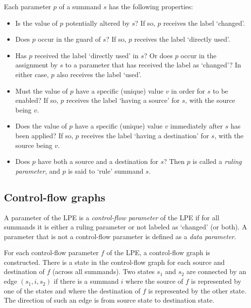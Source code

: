 Each parameter $p$ of a summand $s$ has the following properties:
\begin{itemize}

\item Is the value of $p$ potentially altered by $s$?
If so, $p$ receives the label `changed'.

\item Does $p$ occur in the guard of $s$?
If so, $p$ receives the label `directly used'.

\item Has $p$ received the label `directly used' in $s$?
Or does $p$ occur in the assignment by $s$ to a parameter that has received the label as `changed'?
In either case, $p$ also receives the label `used'.

\item Must the value of $p$ have a specific (unique) value $v$ in order for $s$ to be enabled?
If so, $p$ receives the label `having a source' for $s$, with the source being $v$.

\item Does the value of $p$ have a specific (unique) value $v$ immediately after $s$ has been applied?
If so, $p$ receives the label `having a destination' for $s$, with the source being $v$.

\item Does $p$ have both a source and a destination for $s$?
Then $p$ is called a \emph{ruling parameter}, and $p$ is said to `rule' summand $s$.

\end{itemize}

\subsection{Control-flow graphs}

A parameter of the LPE is a \emph{control-flow parameter} of the LPE if for all summands it is either a ruling parameter or not labeled as `changed' (or both).
A parameter that is not a control-flow parameter is defined as a \emph{data parameter}.

\vspace{1mm}

For each control-flow parameter $f$ of the LPE, a control-flow graph is constructed.
There is a state in the control-flow graph for each source and destination of $f$ (across all summands).
Two states $s_1$ and $s_2$ are connected by an edge $(s_1, i, s_2)$ if there is a summand $i$ where the source of $f$ is represented by one of the states and where the destination of $f$ is represented by the other state.
The direction of such an edge is from source state to destination state.


